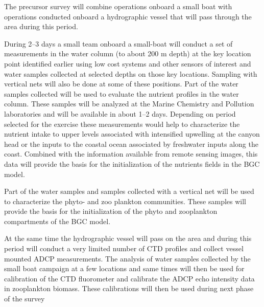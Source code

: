 The precursor survey will combine operations onboard a small boat with
operations conducted onboard a \inst hydrographic vessel that will pass
through the area during this period. 
 
During 2--3 days a small team onboard a small-boat will conduct a set of
measurements in the water column (to about 200 m depth) at the key
location point identified earlier using low cost systems  and other sensors of interest and water samples collected at
selected depths on those key locations. Sampling with vertical nets will
also be done at some of these positions. Part of the water samples
collected will be used to evaluate the nutrient profiles in the water
column. These samples will be analyzed at the \inst Marine Chemistry and
Pollution laboratories and will be available in about 1--2 days.
Depending on period selected for the exercise these measurements would
help to characterize the nutrient intake to upper levels associated
with intensified upwelling at the canyon head or the inputs to the
coastal ocean associated by freshwater inputs along the coast. Combined
with the information available from remote sensing images, this data will
provide the basis for the initialization of the nutrients fields in the
BGC model.
 
Part of the water samples and samples collected with a vertical net will
be used to characterize the phyto- and zoo plankton communities. These
samples will provide the basis for the initialization of the phyto and
zooplankton compartments of the BGC model.
 
At the same time the hydrographic vessel will pass on the area and
during this period will conduct a very limited number of CTD profiles
and collect vessel mounted ADCP measurements. The analysis of water
samples collected by the small boat campaign at a few locations and same
times will then be used for calibration of the CTD fluorometer and
calibrate the ADCP echo intensity data in zooplankton biomass. These
calibrations will then be used during next phase of the survey

 
